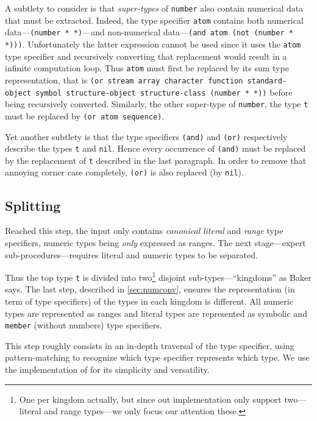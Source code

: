 \documentclass[format=sigconf]{acmart}
\newcommand\code[2][\small]{\sloppy\texttt{#1#2}}
\theoremstyle{definition}
\begin{document}
A subtlety to consider is that \textit{super-types} of \code{number} also
contain numerical data that must be extracted. Indeed, the type specifier
\code{atom} contains both numerical data---\code{(number * *)}---and non-numerical
data---\code{(and atom (not (number * *)))}. Unfortunately the latter
expression cannot be used since it uses the \code{atom} type specifier and
recursively converting that replacement would result in a infinite computation
loop. Thus \code{atom} must first be replaced by its sum type representation,
that is \code{(or stream array character function standard-object symbol
  structure-object structure-class (number * *))} before being recursively
converted. Similarly, the other super-type of \code{number}, the type \code{t}
must be replaced by \code{(or atom sequence)}.

Yet another subtlety is that the type specifiers \code{(and)} and
\code{(or)} respectively describe the types \code{t} and \code{nil}. Hence
every occurrence of \code{(and)} must be replaced by the replacement of
\code{t} described in the last paragraph. In order to remove that annoying
corner case completely, \code{(or)} is also replaced (by \code{nil}).

\subsection{Splitting}
Reached this step, the input only contains \emph{canonical} \emph{literal} and
\emph{range} type specifiers, numeric types being \emph{only} expressed as
ranges. The next stage---expert sub-procedures---requires literal and numeric
types to be separated.

Thus the top type \code{t} is divided into two\footnote{
  One per kingdom actually, but since out implementation only support
  two---literal and range types---we only focus our attention these.
} disjoint sub-types---``kingdoms'' as Baker says. The last step, described in
\vref{sec:numconv}, ensures the representation (in term of type specifiers) of
the types in each kingdom is different. All numeric types are represented as
ranges and literal types are represented as symbolic and \code{member} (without
numbers) type specifiers.

This step roughly consists in an in-depth traversal of the type specifier, using
pattern-matching to recognize which type specifier represents which type. We use
the implementation of \cite{bib:norvig.92.paip} for its simplicity and versatility.
\end{document}
